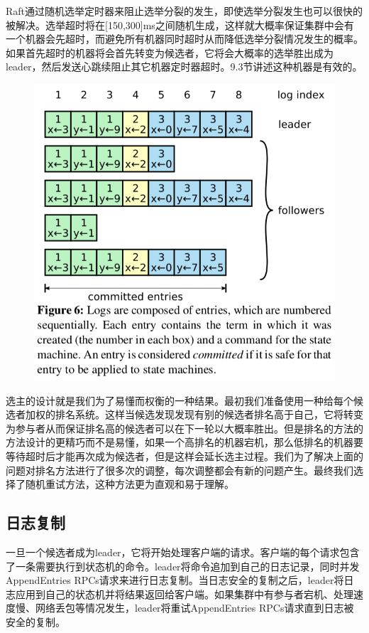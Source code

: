 \documentclass[journal]{IEEEtran}
\begin{document}
Raft通过随机选举定时器来阻止选举分裂的发生，即使选举分裂发生也可以很快的被解决。选举超时将在[150,300]ms之间随机生成，这样就大概率保证集群中会有一个机器会先超时，而避免所有机器同时超时从而降低选举分裂情况发生的概率。如果首先超时的机器将会首先转变为候选者，它将会大概率的选举胜出成为leader，然后发送心跳续阻止其它机器定时器超时。9.3节讲述这种机器是有效的。
\begin{figure}[htbp]
\begin{center}
\includegraphics[width=1\linewidth]{./fig6.png}
\end{center}
\end{figure}


选主的设计就是我们为了易懂而权衡的一种结果。最初我们准备使用一种给每个候选者加权的排名系统。这样当候选发现发现有别的候选者排名高于自己，它将转变为参与者从而保证排名高的候选者可以在下一轮以大概率胜出。但是排名的方法的方法设计的更精巧而不是易懂，如果一个高排名的机器宕机，那么低排名的机器要等待超时后才能再次成为候选者，但是这样会延长选主过程。我们为了解决上面的问题对排名方法进行了很多次的调整，每次调整都会有新的问题产生。最终我们选择了随机重试方法，这种方法更为直观和易于理解。

\subsection{日志复制}
一旦一个候选者成为leader，它将开始处理客户端的请求。客户端的每个请求包含了一条需要执行到状态机的命令。leader将命令追加到自己的日志记录，同时并发AppendEntries RPCs请求来进行日志复制。当日志安全的复制之后，leader将日志应用到自己的状态机并将结果返回给客户端。如果集群中有参与者宕机、处理速度慢、网络丢包等情况发生，leader将重试AppendEntries RPCs请求直到日志被安全的复制。
\end{document}
